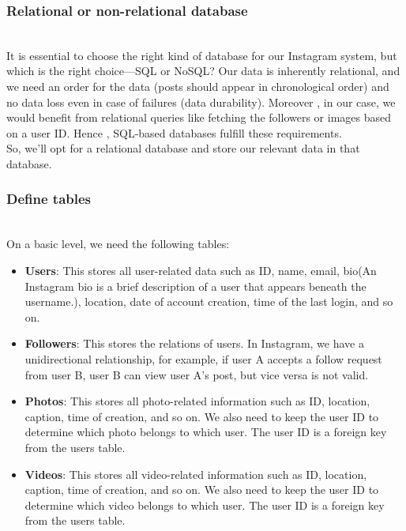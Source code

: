 \subsubsection{Relational or non-relational database}\label{Jjg-NAnJ6Sd_zuxUwzN4M}
\\
It is essential to choose the right kind of database for our Instagram system, but which is the right choice---SQL or NoSQL? Our data is inherently relational, and we need an order for the data (posts should appear in chronological order) and no data loss even in case of failures (data durability). Moreover , in our case, we would benefit from relational queries like fetching the followers or images based on a user ID. Hence
, SQL-based databases fulfill these requirements.
\\
So, we'll opt for a relational database and store our relevant data in that database.

\subsubsection{Define tables}\label{OYzskl0mmUWV7DW_5CKc5}
\\
On a basic level, we need the following tables:

\begin{itemize}
\item
\protect{}\label{caKYqWqC2rIE4a0TUOuA7}
\textbf{Users}: This stores all user-related data such as ID, name, email, bio(An Instagram bio is a brief description of a user that appears beneath the username.), location, date of account creation, time of the last login, and so on.
\item
\protect{}\label{XvYf68hqcS2FE2cA1VaMG}
\textbf{Followers}: This stores the relations of users. In Instagram, we have a unidirectional relationship, for example, if user A accepts a follow request from user B, user B can view user A's post, but vice versa is not valid.
\item
\protect{}\label{gHt3Uvv72Rl2bxtpbmU3m}
\textbf{Photos}: This stores all photo-related information such as ID, location, caption, time of creation, and so on. We also need to keep the user ID to determine which photo belongs to which user. The user ID is a foreign key from the users table.
\item
\protect{}\label{naVW86wVaYKNhGfqbTEJy}
\textbf{Videos}: This stores all video-related information such as ID, location, caption, time of creation, and so on. We also need to keep the user ID to determine which video belongs to which user. The user ID is a foreign key from the users table.
\end{itemize}

